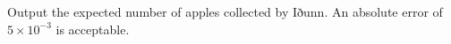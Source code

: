 Output the expected number of apples collected by Iðunn.
An absolute error of $5\times 10^{-3}$ is acceptable.
